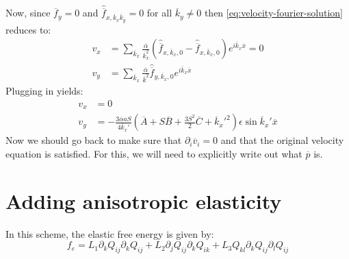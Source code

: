 \documentclass[reqno]{article}
\begin{document}
	Now, since $\overline{f}_y = 0$ and $\hat{\overline{f}}_{x, \overline{k}_x \overline{k}_y} = 0$ for all $\overline{k}_y \neq 0$ then \eqref{eq:velocity-fourier-solution} reduces to:
	\begin{equation}
	\begin{split}
		v_x 
		&= \sum_{\overline{k}_x}
		\frac{\overline{\alpha}}{\overline{k}_x^2}
		\left(
		\hat{\overline{f}}_{x, \overline{k}_x, 0}
		- \hat{\overline{f}}_{x, \overline{k}_x, 0}
		\right)
		e^{i \overline{k}_x \overline{x}}
		= 0 \\
		v_y
		&= \sum_{\overline{k}_x}
		\frac{\overline{\alpha}}{\overline{k}^2}
		\hat{\overline{f}}_{y, \overline{k}_x, 0} 
		e^{i \overline{k}_x \overline{x}}
	\end{split}
	\end{equation}
	Plugging in yields:
	\begin{equation}
	\begin{split}
		v_x
		&= 0 \\
		v_y
		&= -\frac{3 \overline{\alpha} a S}{4 \overline{k}_x'}
		\left(
		\overline{A}
		+ S \overline{B}
		+ \frac{3 S^2}{2} \overline{C}
		+ \overline{k}_x'^2
		\right)
		\epsilon \sin \overline{k}_x' \overline{x}
	\end{split}
	\end{equation}
	Now we should go back to make sure that $\partial_i \overline{v}_i = 0$ and that the original velocity equation is satisfied. 
	For this, we will need to explicitly write out what $\overline{p}$ is. 
	
	\section{Adding anisotropic elasticity}
	In this scheme, the elastic free energy is given by:
	\begin{equation}
		f_e = L_1 \partial_k Q_{ij} \partial_k Q_{ij} 
		+ L_2 \partial_j Q_{ij} \partial_k Q_{ik} 
		+ L_3 Q_{kl} \partial_k Q_{ij} \partial_l Q_{ij}
	\end{equation}
	
\end{document}
